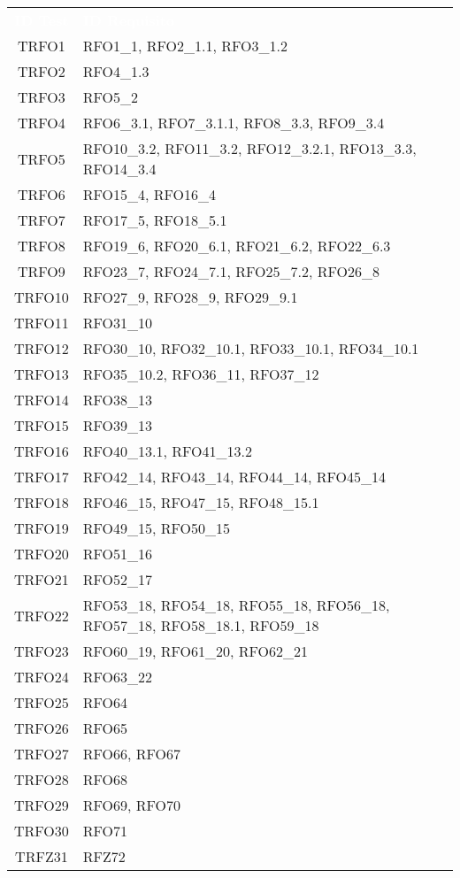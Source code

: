 \begin{longtable}{|c| C{10cm}|} 
	\textcolor{white}{\textbf{ID Test}}&
	\textcolor{white}{\textbf{ID Requisito}}\\
	TRFO1 & RFO1\_1, RFO2\_1.1, RFO3\_1.2\\ \hline
	TRFO2 & RFO4\_1.3\\ \hline
	TRFO3 & RFO5\_2\\ \hline
	TRFO4 & RFO6\_3.1, RFO7\_3.1.1, RFO8\_3.3, RFO9\_3.4\\ \hline
	TRFO5 & RFO10\_3.2, RFO11\_3.2, RFO12\_3.2.1, RFO13\_3.3, RFO14\_3.4\\ \hline
	TRFO6 & RFO15\_4, RFO16\_4\\ \hline
	TRFO7 & RFO17\_5, RFO18\_5.1\\ \hline
	TRFO8 & RFO19\_6, RFO20\_6.1, RFO21\_6.2, RFO22\_6.3\\ \hline
	TRFO9 & RFO23\_7, RFO24\_7.1, RFO25\_7.2, RFO26\_8\\ \hline
	TRFO10 & RFO27\_9, RFO28\_9, RFO29\_9.1\\ \hline
	TRFO11 & RFO31\_10\\ \hline
	TRFO12 & RFO30\_10, RFO32\_10.1, RFO33\_10.1, RFO34\_10.1\\ \hline
	TRFO13 & RFO35\_10.2, RFO36\_11, RFO37\_12\\ \hline
	TRFO14 & RFO38\_13\\ \hline
	TRFO15 & RFO39\_13\\ \hline
	TRFO16 & RFO40\_13.1, RFO41\_13.2\\ \hline
	TRFO17 & RFO42\_14, RFO43\_14, RFO44\_14, RFO45\_14\\ \hline
	TRFO18 & RFO46\_15, RFO47\_15, RFO48\_15.1\\ \hline
	TRFO19 & RFO49\_15, RFO50\_15\\ \hline
	TRFO20 & RFO51\_16\\ \hline
	TRFO21 & RFO52\_17\\ \hline
	TRFO22 & RFO53\_18, RFO54\_18, RFO55\_18, RFO56\_18, RFO57\_18, RFO58\_18.1, RFO59\_18\\ \hline
	TRFO23 & RFO60\_19, RFO61\_20, RFO62\_21\\ \hline
	TRFO24 & RFO63\_22\\ \hline
	TRFO25 & RFO64\\ \hline
	TRFO26 & RFO65\\ \hline
	TRFO27 & RFO66, RFO67\\ \hline
	TRFO28 & RFO68\\ \hline
	TRFO29 & RFO69, RFO70\\ \hline
	TRFO30 & RFO71\\ \hline
	TRFZ31 & RFZ72\\ \hline
\end{longtable}
\newpage
